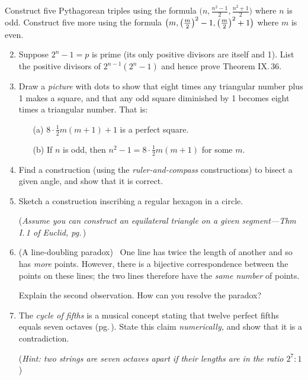 \clearpage


\begin{exercises}{}{}
	\exstart %
	Construct five Pythagorean triples using the formula $\bigl(n,\frac{n^2-1}2,\frac{n^2+1}2\bigr)$ where $n$ is odd. Construct five more using the formula $\bigl(m,\left(\frac{m}{2}\right)^2-1,\left(\frac{m}{2}\right)^2+1\bigr)$ where $m$ is even.%
	
	\begin{enumerate}\setcounter{enumi}{1}
	  \item Suppose $2^n-1=p$ is prime (its only positive divisors are itself and 1). List the positive divisors of $2^{n-1}(2^n-1)$ and hence prove Theorem IX.\,36.
	  
	  \item%
	  Draw a \emph{picture} with dots to show that eight times any triangular number plus 1 makes a square, and that any odd square diminished by 1 becomes eight times a triangular number. That is:
	  \begin{enumerate}
	    \item[(a)] $8\cdot\frac 12m(m+1)+1$ is a perfect square.
	    \item[(b)] If $n$ is odd, then $n^2-1=8\cdot\frac 12m(m+1)$ for some $m$.
	  \end{enumerate}
	  
	  \item%
	  Find a construction (using the \emph{ruler-and-compass} constructions) to bisect a given angle, and show that it is correct.
	 
	  \item%
	  Sketch a construction inscribing a regular hexagon in a circle.\par
	  (\emph{Assume you can construct an equilateral triangle on a given segment---Thm I.\,1 of Euclid, pg.\,\pageref{pg:euclidI1}})
	  
		\item (A line-doubling paradox) \ One line has twice the length of another and so has \emph{more} points. However, there is a bijective correspondence between the points on these lines; the two lines therefore have the \emph{same number} of points.\par
		Explain the second observation. How can you resolve the paradox?
	
	
		\item The \emph{cycle of fifths} is a musical concept stating that twelve perfect fifths equals seven octaves (pg.\,\pageref{pg:pythagtuning}). State this claim \emph{numerically,} and show that it is a contradiction.\par
		(\emph{Hint: two strings are seven octaves apart if their lengths are in the ratio $2^7:1$})
		

\end{enumerate}
\end{exercises}
